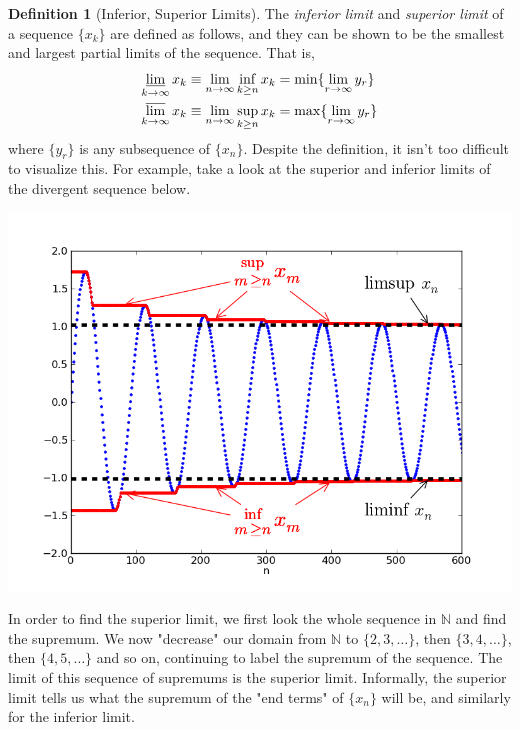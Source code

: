 \documentclass{article}
\theoremstyle{remark}
\theoremstyle{definition}
\newtheorem{definition}{Definition}[section]
\begin{document}
\begin{definition}[Inferior, Superior Limits]
The \textit{inferior limit} and \textit{superior limit} of a sequence $\{x_k\}$ are defined as follows, and they can be shown to be the smallest and largest partial limits of the sequence. That is, 
\begin{align*}
    \varliminf_{k \rightarrow \infty} x_k & \equiv \lim_{n \rightarrow \infty} \inf_{k \geq n}{x_k} = \min\{ \lim_{r \rightarrow \infty} y_r\}\\
    \varlimsup_{k \rightarrow \infty} x_k & \equiv \lim_{n \rightarrow \infty} \sup_{k \geq n}{x_k} = \max\{ \lim_{r \rightarrow \infty} y_r\}
\end{align*}
where $\{y_r\}$ is any subsequence of $\{x_n\}$. Despite the definition, it isn't too difficult to visualize this. For example, take a look at the superior and inferior limits of the divergent sequence below.
\begin{center}
    \includegraphics[scale=0.5]{img/Lim_sup_example.png}
\end{center}
In order to find the superior limit, we first look the whole sequence in $\mathbb{N}$ and find the supremum. We now "decrease" our domain from $\mathbb{N}$ to $\{2, 3, \ldots\}$, then $\{3, 4, \ldots\}$, then $\{4, 5, \ldots\}$ and so on, continuing to label the supremum of the sequence. The limit of this sequence of supremums is the superior limit. Informally, the superior limit tells us what the supremum of the "end terms" of $\{x_n\}$ will be, and similarly for the inferior limit. 


\end{definition}
\end{document}
